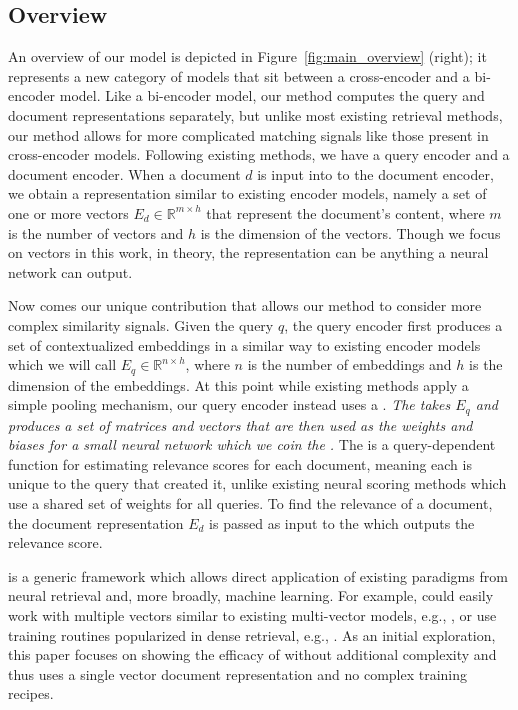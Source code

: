 \documentclass[sigconf,]{acmart}
\begin{document}
\subsection{\name{} Overview}


An overview of our model is depicted in Figure~\ref{fig:main_overview} (right); it represents a new category of models that sit between a cross-encoder and a bi-encoder model. Like a bi-encoder model, our method computes the query and document representations separately, but unlike most existing retrieval methods, our method allows for more complicated matching signals like those present in cross-encoder models. Following existing methods, we have a query encoder and a document encoder. When a document $d$ is input into to the document encoder, we obtain a representation similar to existing encoder models, namely a set of one or more vectors $E_d \in \mathbb{R}^{m \times h}$ that represent the document's content, where $m$ is the number of vectors and $h$ is the dimension of the vectors. Though we focus on vectors in this work, in theory, the representation can be anything a neural network can output.

Now comes our unique contribution that allows our method to consider more complex similarity signals. Given the query $q$, the query encoder \QueryEncoderName{} first produces a set of contextualized embeddings in a similar way to existing encoder models which we will call $E_q \in \mathbb{R}^{n \times h}$, where $n$ is the number of embeddings and $h$ is the dimension of the embeddings. At this point while existing methods apply a simple pooling mechanism, our query encoder instead uses a \HyperHeadName{}. \textit{The \HyperHeadName{} takes $E_q$ and produces a set of matrices and vectors that are then used as the weights and biases for a small neural network which we coin the \mininame{}.} The \mininame{} is a query-dependent function for estimating relevance scores for each document, meaning each \mininame{} is unique to the query that created it, unlike existing neural scoring methods which use a shared set of weights for all queries. To find the relevance of a document, the document representation $E_d$ is passed as input to the \mininame{} which outputs the relevance score.


\name{} is a generic framework which allows direct application of existing paradigms from neural retrieval and, more broadly, machine learning. For example, \name{} could easily work with multiple vectors similar to existing multi-vector models, e.g., \cite{ColBERT_v1}, or use training routines popularized in dense retrieval, e.g., \cite{ANCE,RANCE,CL-DRD,DRAGON}. As an initial exploration, this paper focuses on showing the efficacy of \name{} without additional complexity and thus uses a single vector document representation and no complex training recipes.
\end{document}
